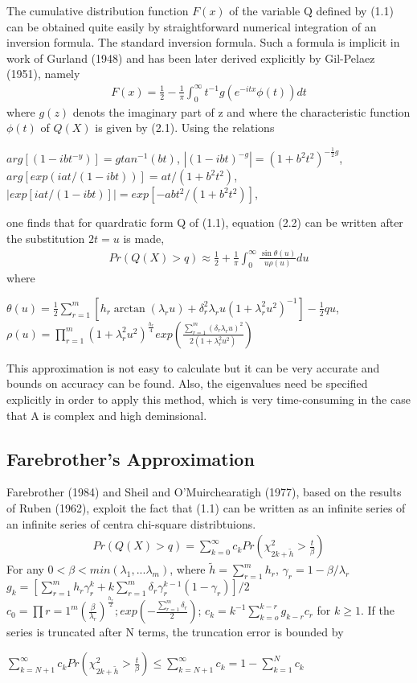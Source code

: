 \documentclass[paper=a4]{article}
\numberwithin{equation}{section}
\begin{document}
The cumulative distribution function $F(x)$ of the variable Q defined by (1.1) can be obtained quite easily by straightforward numerical integration of an inversion formula. The standard inversion formula. Such a formula is implicit in work of Gurland (1948) and has been later derived explicitly by Gil-Pelaez (1951), namely
\begin{align}
F(x)=\frac{1}{2}-\frac{1}{\pi}\int_{0}^{\infty}t^{-1}g(e^{-itx}\phi(t))dt
\end{align}
where $g(z)$ denots the imaginary part of z and where the characteristic function $\phi(t)$ of $Q(X)$ is given by (2.1). Using the relations
\begin{center}
$arg[(1-ibt^{-y})]=gtan^{-1}(bt)$,  $|(1-ibt)^{-g}|=(1+b^2t^2)^{-\frac{1}{2}g}$,\\
$arg[exp(iat/(1-ibt))]=at/(1+b^2t^2)$,$|exp[iat/(1-ibt)]|=exp[-abt^2/(1+b^2t^2)]$,
\end{center}
one finds that for quardratic form Q of (1.1), equation (2.2) can be written after the substitution $2t=u$ is made,
\begin{align}
Pr(Q(X)>q)\approx\frac{1}{2}+\frac{1}{\pi}\int_{0}^{\infty}\frac{\sin\theta(u)}{u\rho(u)}du 
\end{align}	
where
\begin{center}
$\theta(u)=\frac{1}{2}\sum_{r=1}^m[h_r\arctan(\lambda_ru)+\delta_r^2\lambda_ru(1+\lambda_r^2u^2)^{-1}]-\frac{1}{2}qu$,
$\rho(u)=\prod_{r=1}^m(1+\lambda_r^2u^2)^{\frac{h_r}{4}}exp(\frac{\sum_{r=1}^m(\delta_r\lambda_ru)^2}{2(1+\lambda_r^2u^2)})$
\end{center}

This approximation is not easy to calculate but it can be very accurate and bounds on accuracy can be found. Also, the eigenvalues need be specified explicitly in order to apply this method, which is very time-consuming in the case that A is complex and high deminsional.

\subsection{Farebrother's Approximation}
Farebrother (1984) and Sheil and O'Muirchearatigh (1977), based on the results of Ruben (1962), exploit the fact that (1.1) can be written as an infinite series of an infinite series of centra chi-square distribtuions.
\begin{align}
Pr(Q(X)>q)=\sum_{k=0}^\infty c_k Pr(\chi_{2k+\tilde{h}}^2 >\frac{t}{\beta})  
\end{align}
For any $0< \beta <min(\lambda_1,...\lambda_m)$, where $\tilde{h}=\sum_{r=1}^mh_r$, $\gamma_r=1-\beta/\lambda_r$\\
$g_k=[\sum_{r=1}^mh_r\gamma_r^k+k\sum_{r=1}^m\delta_r\gamma_r^{k-1}(1-\gamma_r)]/2$
$ c_0=\prod{r=1}^m (\frac{\beta}{\lambda_r})^{\frac{h_r}{2}};exp(-\frac{\sum_{r=1}^m\delta_r}{2})$; $c_k=k^{-1}\sum_{k=o}^{k-r}g_{k-r}c_r$ for $k\geq1$. If the series is truncated after N terms, the truncation error is bounded by
\begin{center}
	$\sum_{k=N+1}^{\infty}c_k Pr(\chi_{2k+\tilde{h}}^2 > \frac{t}{\beta}) \leq \sum_{k=N+1}^\infty c_k=1-\sum_{k=1}^N c_k$
	\end{center}
	
\end{document}
